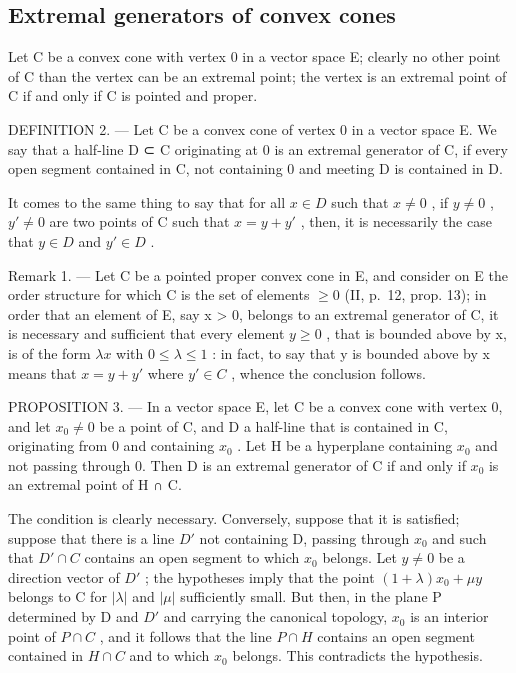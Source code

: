 \subsection{Extremal generators of convex cones}

Let C be a convex cone with vertex 0 in a vector space E; clearly no other point of C than the vertex can be an extremal point; the vertex is an extremal point of C if and only if C is pointed and proper.

DEFINITION 2. --- Let C be a convex cone of vertex 0 in a vector space E. We say that a half-line D ⊂ C originating at 0 is an extremal generator of C, if every open segment contained in C, not containing 0 and meeting D is contained in D.

It comes to the same thing to say that for all \(x \in D\) such that \(x \neq 0\) , if \(y \neq 0\) , \(y' \neq 0\) are two points of C such that \(x = y + y'\) , then, it is necessarily the case that \(y \in D\) and \(y' \in D\) .

Remark 1. --- Let C be a pointed proper convex cone in E, and consider on E the order structure for which C is the set of elements \(\geqslant 0\) (II, p.~12, prop. 13); in order that an element of E, say x \textgreater{} 0, belongs to an extremal generator of C, it is necessary and sufficient that every element \(y \geqslant 0\) , that is bounded above by x, is of the form \(\lambda x\) with \(0 \leqslant \lambda \leqslant 1\) : in fact, to say that y is bounded above by x means that \(x = y + y'\) where \(y' \in C\) , whence the conclusion follows.

PROPOSITION 3. --- In a vector space E, let C be a convex cone with vertex 0, and let \(x_{0} \neq 0\) be a point of C, and D a half-line that is contained in C, originating from 0 and containing \(x_{0}\) . Let H be a hyperplane containing \(x_{0}\) and not passing through 0. Then D is an extremal generator of C if and only if \(x_{0}\) is an extremal point of H ∩ C.

The condition is clearly necessary. Conversely, suppose that it is satisfied; suppose that there is a line \(D'\) not containing D, passing through \(x_{0}\) and such that \(D' \cap C\) contains an open segment to which \(x_{0}\) belongs. Let \(y \neq 0\) be a direction vector of \(D'\) ; the hypotheses imply that the point \((1 + \lambda)x_{0} + \mu y\) belongs to C for \(|\lambda|\) and \(|\mu|\) sufficiently small. But then, in the plane P determined by D and \(D'\) and carrying the canonical topology, \(x_{0}\) is an interior point of \(P \cap C\) , and it follows that the line \(P \cap H\) contains an open segment contained in \(H \cap C\) and to which \(x_{0}\) belongs. This contradicts the hypothesis.

